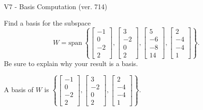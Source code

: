 \begin{exercise}
  \begin{exerciseTitle}V7 - Basis Computation (ver. 714)\end{exerciseTitle}
  \begin{exerciseStatement}
    Find a basis for the subspace 
\[W=\mathrm{span}\ \left\{\left[\begin{array}{r}
-1 \\
0 \\
-2 \\
2
\end{array}\right] , \left[\begin{array}{r}
3 \\
-2 \\
0 \\
2
\end{array}\right] , \left[\begin{array}{r}
5 \\
-6 \\
-8 \\
14
\end{array}\right] , \left[\begin{array}{r}
2 \\
-4 \\
-4 \\
1
\end{array}\right]\right\}.\]
 Be sure to explain why your result is a basis.


  \end{exerciseStatement}
  \begin{exerciseAnswer}
   A basis of \(W\) is  \(\left\{\left[\begin{array}{r}
-1 \\
0 \\
-2 \\
2
\end{array}\right] , \left[\begin{array}{r}
3 \\
-2 \\
0 \\
2
\end{array}\right] , \left[\begin{array}{r}
2 \\
-4 \\
-4 \\
1
\end{array}\right]\right\}\).
  


  \end{exerciseAnswer}
\end{exercise}